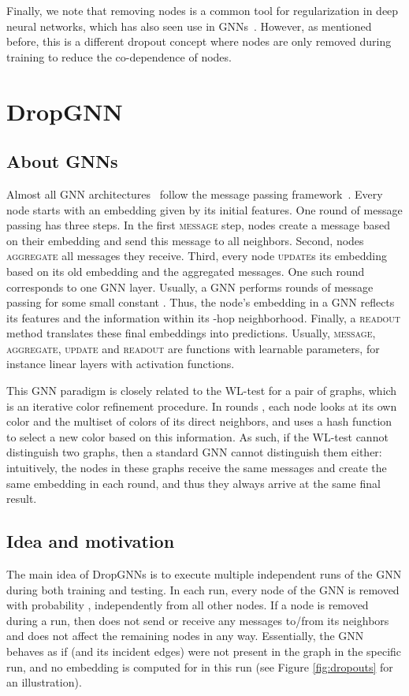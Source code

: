 \documentclass{article}
\begin{document}
Finally, we note that removing nodes is a common tool for regularization in deep neural networks, which has also seen use in GNNs~\citep{rong2019dropedge, Grand}. However, as mentioned before, this is a different dropout concept where nodes are only removed during training to reduce the co-dependence of nodes.

\section{DropGNN}

\subsection{About GNNs}
Almost all GNN architectures~\citep{velickovic2018graph, kipf2017semisupervised, GIN, defferrard2016convolutional, wu2020comprehensive, hamilton2017inductive, xu2018jumping} follow the message passing framework~\citep{gilmer2017neural, battaglia2018relational}. Every node starts with an embedding given by its initial features. One round of message passing has three steps. In the first \textsc{message} step, nodes create a message based on their embedding and send this message to all neighbors. Second, nodes \textsc{aggregate} all messages they receive. Third, every node \textsc{update}s its embedding based on its old embedding and the aggregated messages. One such round corresponds to one GNN layer. Usually, a GNN performs  rounds of message passing for some small constant . Thus, the node's embedding in a GNN reflects its features and the information within its -hop neighborhood. Finally, a \textsc{readout} method translates these final embeddings into predictions. Usually, \textsc{message}, \textsc{aggregate}, \textsc{update} and \textsc{readout} are functions with learnable parameters, for instance linear layers with activation functions.

This GNN paradigm is closely related to the WL-test for a pair of graphs, which is an iterative color refinement procedure. In rounds , each node looks at its own color and the multiset of colors of its direct neighbors, and uses a hash function to select a new color based on this information. As such, if the WL-test cannot distinguish two graphs, then a standard GNN cannot distinguish them either: intuitively, the nodes in these graphs receive the same messages and create the same embedding in each round, and thus they always arrive at the same final result.

\subsection{Idea and motivation}
The main idea of DropGNNs is to execute multiple independent runs of the GNN during both training and testing. In each run, every node of the GNN is removed with probability , independently from all other nodes. If a node  is removed during a run, then  does not send or receive any messages to/from its neighbors and does not affect the remaining nodes in any way. Essentially, the GNN behaves as if  (and its incident edges) were not present in the graph in the specific run, and no embedding is computed for  in this run (see Figure \ref{fig:dropouts} for an illustration).
\end{document}
